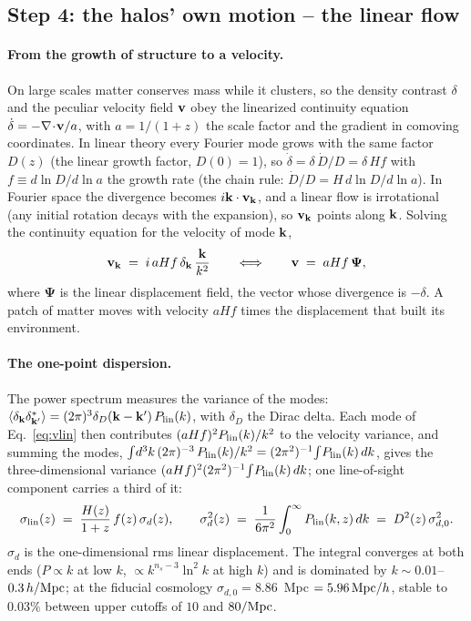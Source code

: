 \documentclass[11pt]{article}
\newcommand{\slin}{\sigma_{\rm lin}}
\newcommand{\hMpc}{\,h/{\rm Mpc}}
\newcommand{\Mpch}{\,{\rm Mpc}/h}
\begin{document}
\subsection{Step 4: the halos' own motion -- the linear flow}
\label{sec:linear}

\paragraph{From the growth of structure to a velocity.}
On large scales matter conserves mass while it clusters, so the
density contrast $\delta$ and the peculiar velocity field ${\bf v}$
obey the linearized continuity equation
$\dot{\delta} = -\nabla\!\cdot\!{\bf v}/a$, with $a = 1/(1+z)$ the
scale factor and the gradient in comoving coordinates.  In linear
theory every Fourier mode grows with the same factor $D(z)$ (the
linear growth factor, $D(0) = 1$), so
$\dot{\delta} = \delta\, \dot{D}/D = \delta\, H f$ with
$f \equiv d\ln D/d\ln a$ the growth rate (the chain rule:
$\dot{D}/D = H\, d\ln D/d\ln a$).  In Fourier space the divergence
becomes $i{\bf k}\cdot{\bf v}_{\bf k}$, and a linear flow is
irrotational (any initial rotation decays with the expansion), so
${\bf v}_{\bf k}$ points along ${\bf k}$.  Solving the continuity
equation for the velocity of mode ${\bf k}$,
\begin{equation}
  {\bf v}_{\bf k} \;=\; i\, a H f\, \delta_{\bf k}\,
  \frac{{\bf k}}{k^2}
  \qquad\Longleftrightarrow\qquad
  {\bf v} \;=\; a H f\, \boldsymbol{\Psi} ,
  \label{eq:vlin}
\end{equation}
where $\boldsymbol{\Psi}$ is the linear displacement field, the vector
whose divergence is $-\delta$.  A patch of matter moves with velocity
$aHf$ times the displacement that built its environment.

\paragraph{The one-point dispersion.}
The power spectrum measures the variance of the modes:
$\langle\delta_{\bf k}\delta^*_{{\bf k}'}\rangle =
(2\pi)^3\delta_D({\bf k} - {\bf k}')\,P_{\rm lin}(k)$, with $\delta_D$
the Dirac delta.  Each mode of Eq.~\eqref{eq:vlin} then contributes
$(aHf)^2 P_{\rm lin}(k)/k^2$ to the velocity variance, and summing the
modes, $\int\! d^3k\,(2\pi)^{-3}\, P_{\rm lin}(k)/k^2 =
(2\pi^2)^{-1}\!\int\! P_{\rm lin}(k)\,dk$, gives the three-dimensional
variance $(aHf)^2 (2\pi^2)^{-1}\!\int\! P_{\rm lin}(k)\,dk$; one
line-of-sight component carries a third of it:
\begin{equation}
  \slin(z) \;=\; \frac{H(z)}{1+z}\, f(z)\, \sigma_d(z) ,
  \qquad
  \sigma_d^2(z) \;=\; \frac{1}{6\pi^2}\int_0^\infty
  P_{\rm lin}(k, z)\, dk \;=\; D^2(z)\,\sigma_{d,0}^2 .
  \label{eq:siglin}
\end{equation}
$\sigma_d$ is the one-dimensional rms linear displacement.  The
integral converges at both ends ($P \propto k$ at low $k$,
$\propto k^{n_s - 3}\ln^2 k$ at high $k$) and is dominated by
$k \sim 0.01$--$0.3\hMpc$; at the fiducial cosmology
$\sigma_{d,0} = 8.86$~Mpc $= 5.96\Mpch$, stable to $0.03\%$ between
upper cutoffs of $10$ and $80/{\rm Mpc}$.
\end{document}
